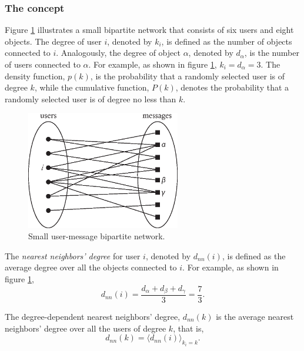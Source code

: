     \subsubsection{The concept}
    
      Figure \ref{fig:cs_network} illustrates a small bipartite network that consists of six users and eight objects. The degree of user $i$, denoted by $k_i$, is defined as the number of objects connected to $i$. Analogously, the degree of object $\alpha$, denoted by $d_\alpha$, is the number of users connected to $\alpha$. For example, as shown in figure \ref{fig:cs_network}, $k_i = d_\alpha = 3$. The density function, $p(k)$, is the probability that a randomly selected user is of degree $k$, while the cumulative function, $P(k)$, denotes the probability that a randomly selected user is of degree no less than $k$.
      \begin{figure}[h]
        \centering
        \includegraphics[width=0.6\textwidth]{chapters/03_implementation/cs_network}
        \caption{Small user-message bipartite network.}
        \label{fig:cs_network}
      \end{figure}
      
      The \emph{nearest neighbors’ degree} for user $i$, denoted by $d_{nn}(i)$, is defined as the average degree over all the objects connected to $i$. For example, as shown in figure \ref{fig:cs_network},
      \begin{equation}
        d_{nn}(i) = \frac{d_\alpha + d_\beta + d_\gamma}{3} = \frac{7}{3}\mbox{.}
      \end{equation}

      The degree-dependent nearest neighbors’ degree, $d_{nn}(k)$ is the average nearest neighbors’ degree over all the users of degree $k$, that is,
      \begin{equation}
        d_{nn}(k) = \langle d_{nn}(i) \rangle_{k_i=k}\mbox{.}
      \end{equation}

